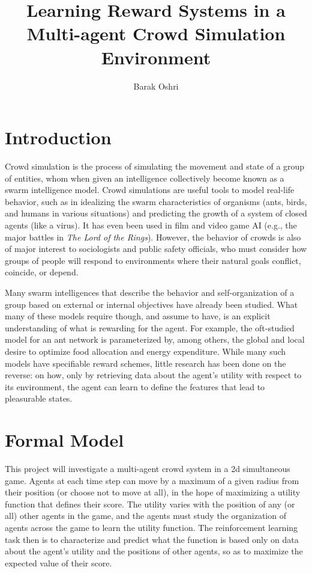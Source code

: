 \documentclass[10pt]{amsart}
\title{Learning Reward Systems in a Multi-agent Crowd Simulation Environment}
\author{Barak Oshri}
\theoremstyle{definition}
\begin{document}

\maketitle

\vspace{-0.5cm}

\section{Introduction}

Crowd simulation is the process of simulating the movement and state of a group of entities, whom when given an intelligence collectively become known as a swarm intelligence model. Crowd simulations are useful tools to model real-life behavior, such as in idealizing the swarm characteristics of organisms (ants, birds, and humans in various situations) and predicting the growth of a system of closed agents (like a virus). It has even been used in film and video game AI (e.g., the major battles in \emph{The Lord of the Rings}). However, the behavior of crowds is also of major interest to sociologists and public safety officials, who must consider how groups of people will respond to environments where their natural goals conflict, coincide, or depend. 

Many swarm intelligences that describe the behavior and self-organization of a group based on external or internal objectives have already been studied. What many of these models require though, and assume to have, is an explicit understanding of what is rewarding for the agent. For example, the oft-studied model for an ant network is parameterized by, among others, the global and local desire to optimize food allocation and energy expenditure. While many such models have specifiable reward schemes, little research has been done on the reverse: on how, only by retrieving data about the agent's utility with respect to its environment, the agent can learn to define the features that lead to pleasurable states. 

\section{Formal Model}

This project will investigate a multi-agent crowd system in a 2d simultaneous game. Agents at each time step can move by a maximum of a given radius from their position (or choose not to move at all), in the hope of maximizing a utility function that defines their score. The utility varies with the position of any (or all) other agents in the game, and the agents must study the organization of agents across the game to learn the utility function. The reinforcement learning task then is to characterize and predict what the function is based only on data about the agent's utility and the positions of other agents, so as to maximize the expected value of their score.
\end{document}
